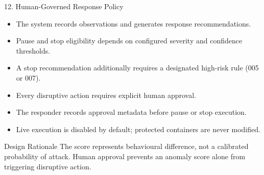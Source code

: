 \documentclass[aspectratio=169,10pt]{beamer}
\begin{document}
\begin{frame}{12. Human-Governed Response Policy}
\begin{itemize}
  \item The system records observations and generates response recommendations.
  \item Pause and stop eligibility depends on configured severity and confidence thresholds.
  \item A stop recommendation additionally requires a designated high-risk rule (005 or 007).
  \item Every disruptive action requires explicit human approval.
  \item The responder records approval metadata before pause or stop execution.
  \item Live execution is disabled by default; protected containers are never modified.
\end{itemize}
\begin{block}{Design Rationale}
The score represents behavioural difference, not a calibrated probability of attack. Human approval prevents an anomaly score alone from triggering disruptive action.
\end{block}
\end{frame}

\end{document}
